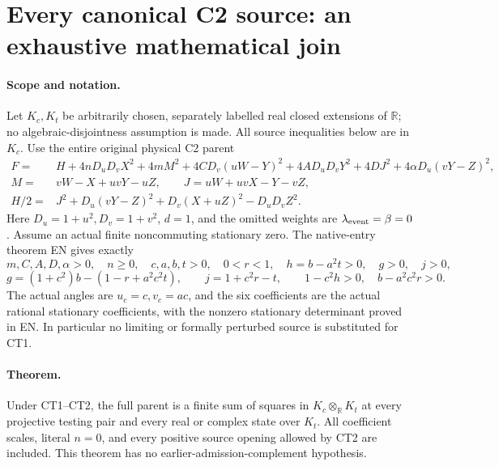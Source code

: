 \section{\texorpdfstring{Every canonical C2 source: an exhaustive mathematical join}{Every canonical C2 source: an exhaustive mathematical join}}
\label{component:pe351eb06b28b}

\label{pe351eb06b28b:sec:c2-complete-source-routing}

\paragraph{Scope and notation.}
Let \(K_c,K_t\) be arbitrarily chosen, separately labelled real closed
extensions of \(\mathbb R\); no algebraic-disjointness assumption is made.
All source inequalities below are in \(K_c\).
Use the entire original physical C2 parent
\[
\begin{split}
 F={}&H+4nD_uD_vX^2+4mM^2+4CD_v(uW-Y)^2
       +4AD_uD_vY^2+4DJ^2+4\alpha D_u(vY-Z)^2,\\
 M={}&vW-X+uvY-uZ,\qquad J=uW+uvX-Y-vZ,\\
 H/2={}&J^2+D_u(vY-Z)^2+D_v(X+uZ)^2-D_uD_vZ^2 .
\end{split}\tag{CT1}
\]
Here \(D_u=1+u^2,D_v=1+v^2\), \(d=1\), and the omitted weights are
\(\lambda_{\rm event}=\beta=0\).  Assume an actual finite noncommuting
stationary zero.  The native-entry theorem EN gives exactly
\[
 m,C,A,D,\alpha>0,\quad n\geq0,\quad
 c,a,b,t>0,\quad 0<r<1,\quad
 h=b-a^2t>0,\quad g>0,\quad j>0,
\]
\[
 g=(1+c^2)b-(1-r+a^2c^2t),\qquad j=1+c^2r-t,\qquad
 1-c^2h>0,\quad b-a^2c^2r>0.                    \tag{CT2}
\]
The actual angles are \(u_c=c,v_c=ac\), and the six coefficients
are the actual rational stationary coefficients, with the nonzero
stationary determinant proved in EN.  In particular no limiting or
formally perturbed source is substituted for CT1.

\paragraph{Theorem.}
Under CT1--CT2, the full parent is a finite sum of squares in
\(K_c\otimes_{\mathbb R}K_t\) at every projective testing pair and
every real or complex state over \(K_t\).
All coefficient scales, literal \(n=0\), and every positive source
opening allowed by CT2 are included.  This theorem has no
earlier-admission-complement hypothesis.

